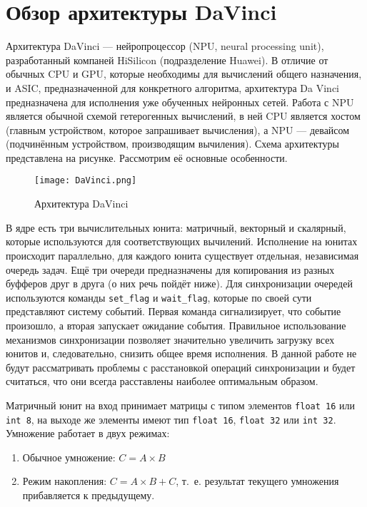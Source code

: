 \section{Обзор архитектуры DaVinci}
\label{sec:Chapter6} 

Архитектура DaVinci --- нейропроцессор (NPU, neural processing unit),
разработанный компаней HiSilicon (подразделение Huawei). В отличие от
обычных CPU и GPU, которые необходимы для вычислений общего назначения,
и ASIC, предназначенной для конкретного алгоритма, архитектура Da Vinci
предназначена для исполнения уже обученных нейронных сетей. Работа с NPU
является обычной схемой гетерогенных вычислений, в ней CPU является хостом
(главным устройством, которое запрашивает вычисления), а NPU --- девайсом
(подчинённым устройством, производящим вычиления). Схема архитектуры
представлена на рисунке. Рассмотрим её основные особенности.

\begin{figure}[h!]
    \centering
    \texttt{[image: DaVinci.png]}
    \caption{Архитектура DaVinci}
\end{figure}

В ядре есть три вычислительных юнита: матричный, векторный и скалярный,
которые используются для соответствующих вычилений.  Исполнение на юнитах
происходит параллельно, для каждого юнита существует
отдельная, независимая очередь задач. Ещё три очереди предназначены для
копирования из разных буфферов друг в друга (о них речь пойдёт ниже).
Для синхронизации очередей используются команды \texttt{set\_flag} и \texttt{wait\_flag},
которые по своей сути представляют систему событий. Первая команда сигнализирует,
что событие произошло, а вторая запускает ожидание события. Правильное
использование механизмов синхронизации позволяет значительно увеличить
загрузку всех юнитов и, следовательно, снизить общее время исполнения.
В данной работе не будут рассматривать проблемы с расстановкой операций
синхронизации и будет считаться, что они всегда расставлены наиболее
оптимальным образом.

Матричный юнит на вход принимает матрицы с типом элементов \texttt{float 16}
или \texttt{int 8}, на выходе же элементы имеют тип \texttt{float 16},
\texttt{float 32} или \texttt{int 32}. Умножение работает в двух режимах:

\begin{enumerate}
    \item Обычное умножение: $C = A \times B$
    \item Режим накопления: $C = A \times B + C$, т.~е. результат текущего
          умножения прибавляется к предыдущему.
\end{enumerate}

